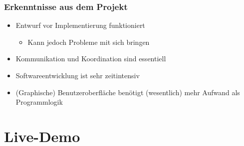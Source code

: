 \documentclass[t]{beamer}
\begin{document}
\begin{frame}
    \frametitle{Erkenntnisse aus dem Projekt}
    \begin{itemize}
        \item<+-> Entwurf vor Implementierung funktioniert
        	\begin{itemize}
        		\item<+-> Kann jedoch Probleme mit sich bringen
        	\end{itemize}
        \item<+-> Kommunikation und Koordination sind essentiell
        \item<+-> Softwareentwicklung ist sehr zeitintensiv
        \item<+-> (Graphische) Benutzeroberfläche benötigt (wesentlich) mehr Aufwand als Programmlogik
    \end{itemize}
\end{frame}

\section{Live-Demo}


\end{document}
